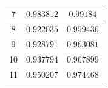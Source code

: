 \begin{frame}
\begin{table}[t]
\begin{tabular*}{75mm}{c c c}
\midrule
\hspace{2mm} \small{7}           & \hspace{2mm} \small{$0.983812$} & \hspace{2mm} \small{$0.99184$} \\
\midrule
\hspace{2mm} \small{8}           & \hspace{2mm} \small{$0.922035$} & \hspace{2mm} \small{$0.959436$} \\
\midrule
\hspace{2mm} \small{9}           & \hspace{2mm} \small{$0.928791$} & \hspace{2mm} \small{$0.963081$} \\
\midrule
\hspace{2mm} \small{10}          & \hspace{2mm} \small{$0.937794$} & \hspace{2mm} \small{$0.967899$} \\
\midrule
\hspace{2mm} \small{11}          & \hspace{2mm} \small{$0.950207$} & \hspace{2mm} \small{$0.974468$} \\
\bottomrule
\end{tabular*}
\end{table}
\end{frame} 


